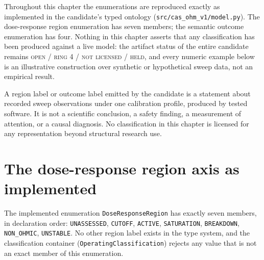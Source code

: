 Throughout this chapter the enumerations are reproduced exactly as
implemented in the candidate's typed ontology
(\texttt{src/cas\_ohm\_v1/model.py}). The dose-response region enumeration has
seven members; the semantic outcome enumeration has four. Nothing in this
chapter asserts that any classification has been produced against a live
model: the artifact status of the entire candidate remains
\textsc{open / ring 4 / not licensed / held}, and every numeric example below
is an illustrative construction over synthetic or hypothetical sweep data, not
an empirical result.

\begin{boundary}\label{ch07:bound:ring4}
A region label or outcome label emitted by the candidate is a statement about
recorded sweep observations under one calibration profile, produced by tested
software. It is not a scientific conclusion, a safety finding, a measurement
of attention, or a causal diagnosis. No classification in this chapter is
licensed for any representation beyond structural research use.
\end{boundary}

\section{The dose-response region axis as implemented}\label{ch07:sec:region}

\begin{definition}\label{ch07:def:region}
The implemented enumeration \texttt{DoseResponseRegion} has exactly seven
members, in declaration order: \texttt{UNASSESSED}, \texttt{CUTOFF},
\texttt{ACTIVE}, \texttt{SATURATION}, \texttt{BREAKDOWN},
\texttt{NON\_OHMIC}, \texttt{UNSTABLE}. No other region label exists in the
type system, and the classification container
(\texttt{OperatingClassification}) rejects any value that is not an exact
member of this enumeration.
\end{definition}

